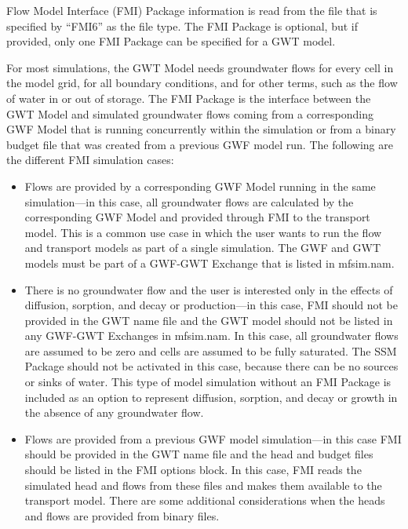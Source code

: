Flow Model Interface (FMI) Package information is read from the file that is specified by ``FMI6'' as the file type.  The FMI Package is optional, but if provided, only one FMI Package can be specified for a GWT model.

For most simulations, the GWT Model needs groundwater flows for every cell in the model grid, for all boundary conditions, and for other terms, such as the flow of water in or out of storage.  The FMI Package is the interface between the GWT Model and simulated groundwater flows coming from a corresponding GWF Model that is running concurrently within the simulation or from a binary budget file that was created from a previous GWF model run.  The following are the different FMI simulation cases:

\begin{itemize}

\item Flows are provided by a corresponding GWF Model running in the same simulation---in this case, all groundwater flows are calculated by the corresponding GWF Model and provided through FMI to the transport model.  This is a common use case in which the user wants to run the flow and transport models as part of a single simulation.  The GWF and GWT models must be part of a GWF-GWT Exchange that is listed in mfsim.nam.

\item There is no groundwater flow and the user is interested only in the effects of diffusion, sorption, and decay or production---in this case, FMI should not be provided in the GWT name file and the GWT model should not be listed in any GWF-GWT Exchanges in mfsim.nam.  In this case, all groundwater flows are assumed to be zero and cells are assumed to be fully saturated.  The SSM Package should not be activated in this case, because there can be no sources or sinks of water.  This type of model simulation without an FMI Package is included as an option to represent diffusion, sorption, and decay or growth in the absence of any groundwater flow.

\item Flows are provided from a previous GWF model simulation---in this case FMI should be provided in the GWT name file and the head and budget files should be listed in the FMI options block.  In this case, FMI reads the simulated head and flows from these files and makes them available to the transport model.  There are some additional considerations when the heads and flows are provided from binary files.


\end{itemize}
